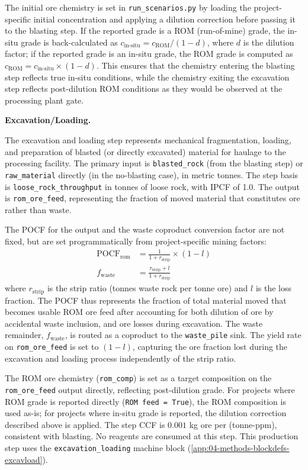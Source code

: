 The initial ore chemistry is set in \texttt{run\_scenarios.py} by loading the project-specific initial concentration and applying a dilution correction before passing it to the blasting step. If the reported grade is a ROM (run-of-mine) grade, the in-situ grade is back-calculated as $c_{\text{in-situ}} = c_{\text{ROM}} / (1 - d)$, where $d$ is the dilution factor; if the reported grade is an in-situ grade, the ROM grade is computed as $c_{\text{ROM}} = c_{\text{in-situ}} \times (1 - d)$. This ensures that the chemistry entering the blasting step reflects true in-situ conditions, while the chemistry exiting the excavation step reflects post-dilution ROM conditions as they would be observed at the processing plant gate.

\medskip
\noindent\textbf{Excavation/Loading.}\quad

The excavation and loading step represents mechanical fragmentation, loading, and preparation of blasted (or directly excavated) material for haulage to the processing facility. The primary input is \texttt{blasted\_rock} (from the blasting step) or \texttt{raw\_material} directly (in the no-blasting case), in metric tonnes. The step basis is \texttt{loose\_rock\_throughput} in tonnes of loose rock, with IPCF of 1.0. The output is \texttt{rom\_ore\_feed}, representing the fraction of moved material that constitutes ore rather than waste.

The POCF for the output and the waste coproduct conversion factor are not fixed, but are set programmatically from project-specific mining factors:
\begin{align}
	\text{POCF}_{\text{rom}} &= \frac{1}{1 + r_{\text{strip}}} \times (1 - l) \\
	f_{\text{waste}} &= \frac{r_{\text{strip}} + l}{1 + r_{\text{strip}}}
\end{align}
where $r_{\text{strip}}$ is the strip ratio (tonnes waste rock per tonne ore) and $l$ is the loss fraction. The POCF thus represents the fraction of total material moved that becomes usable ROM ore feed after accounting for both dilution of ore by accidental waste inclusion, and ore losses during excavation. The waste remainder, $f_{\text{waste}}$, is routed as a coproduct to the \texttt{waste\_pile} sink. The yield rate on \texttt{rom\_ore\_feed} is set to $(1-l)$, capturing the ore fraction lost during the excavation and loading process independently of the strip ratio.

The ROM ore chemistry (\texttt{rom\_comp}) is set as a target composition on the \texttt{rom\_ore\_feed} output directly, reflecting post-dilution grade. For projects where ROM grade is reported directly (\texttt{ROM feed = True}), the ROM composition is used as-is; for projects where in-situ grade is reported, the dilution correction described above is applied. The step CCF is $0.001$ kg ore per (tonne-ppm), consistent with blasting. No reagents are consumed at this step. This production step uses the \texttt{excavation\_loading} machine block (\ref{app:04-methods-blockdefs-excavload}).


